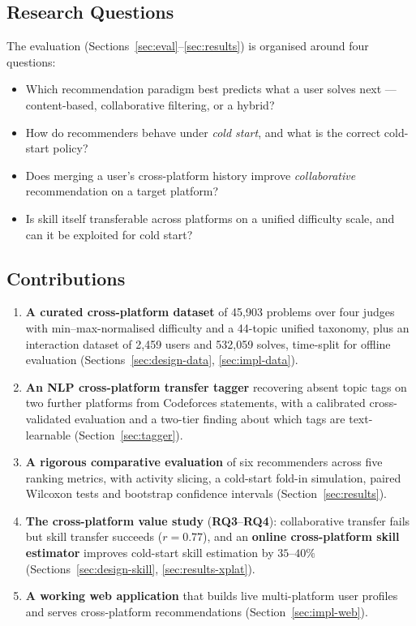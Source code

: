 \documentclass[12pt,a4paper]{article}
\newcommand{\RQ}[1]{\textbf{RQ#1}}
\begin{document}
\subsection{Research Questions}
The evaluation (Sections~\ref{sec:eval}--\ref{sec:results}) is organised around four
questions:
\begin{itemize}
    \item[\RQ{1}] Which recommendation paradigm best predicts what a user solves next
    --- content-based, collaborative filtering, or a hybrid?
    \item[\RQ{2}] How do recommenders behave under \emph{cold start}, and what is the
    correct cold-start policy?
    \item[\RQ{3}] Does merging a user's cross-platform history improve
    \emph{collaborative} recommendation on a target platform?
    \item[\RQ{4}] Is skill itself transferable across platforms on a unified difficulty
    scale, and can it be exploited for cold start?
\end{itemize}

\subsection{Contributions}
\label{sec:contributions}
\begin{enumerate}
    \item \textbf{A curated cross-platform dataset} of 45{,}903 problems over four
    judges with min--max-normalised difficulty and a 44-topic unified taxonomy, plus an
    interaction dataset of 2{,}459 users and 532{,}059 solves, time-split for offline
    evaluation (Sections~\ref{sec:design-data}, \ref{sec:impl-data}).
    \item \textbf{An NLP cross-platform transfer tagger} recovering absent topic tags on
    two further platforms from Codeforces statements, with a calibrated cross-validated
    evaluation and a two-tier finding about which tags are text-learnable
    (Section~\ref{sec:tagger}).
    \item \textbf{A rigorous comparative evaluation} of six recommenders across five
    ranking metrics, with activity slicing, a cold-start fold-in simulation, paired
    Wilcoxon tests and bootstrap confidence intervals (Section~\ref{sec:results}).
    \item \textbf{The cross-platform value study} (\RQ{3}--\RQ{4}): collaborative
    transfer fails but skill transfer succeeds ($r=0.77$), and an \textbf{online
    cross-platform skill estimator} improves cold-start skill estimation by
    $35$--$40\%$ (Sections~\ref{sec:design-skill}, \ref{sec:results-xplat}).
    \item \textbf{A working web application} that builds live multi-platform user
    profiles and serves cross-platform recommendations (Section~\ref{sec:impl-web}).
\end{enumerate}
\end{document}

